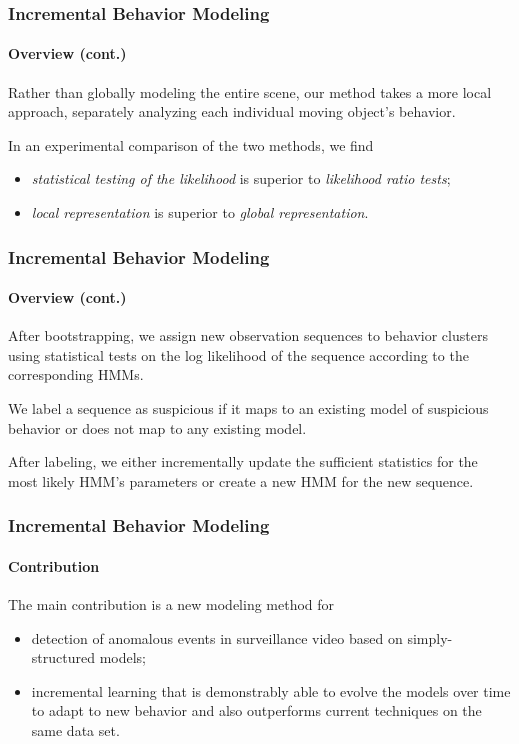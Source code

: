 \begin{frame}
    \frametitle{Incremental Behavior Modeling}
    \framesubtitle{Overview (cont.)}
    
    Rather than globally modeling the entire scene, our method 
    takes a more local approach, separately analyzing each individual 
    moving object's behavior. 

    \bigskip
    
    In an experimental comparison of the two methods, we find 
    \begin{itemize}
        \item {\em statistical testing of the likelihood} is superior to 
            {\em likelihood ratio tests}; 
        \item {\em local representation} is superior to {\em global 
            representation}.
    \end{itemize}

\end{frame}


\begin{frame}
    \frametitle{Incremental Behavior Modeling}
    \framesubtitle{Overview (cont.)}
    
    After bootstrapping, we assign new observation sequences to 
    behavior clusters using statistical tests on the log likelihood 
    of the sequence according to the corresponding HMMs.

    \bigskip

    We label a sequence as suspicious if it maps to an existing 
    model of suspicious behavior or does not map to any existing 
    model. 

    \bigskip

    After labeling, we either incrementally update the sufficient 
    statistics for the most likely HMM's parameters or create a new 
    HMM for the new sequence.

\end{frame}


\begin{frame}
    \frametitle{Incremental Behavior Modeling}
    \framesubtitle{Contribution}

    The main contribution is a new modeling method for 
    \begin{itemize}
        \item detection of anomalous events in 
            surveillance video based on simply-structured models; 
        \item incremental learning that is demonstrably able to evolve 
            the models over time to adapt to new behavior and also
            outperforms current techniques on the same data set.
    \end{itemize}

\end{frame}

